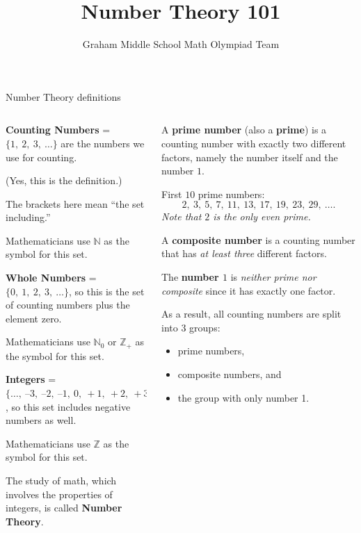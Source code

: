 \documentclass[9pt,aspectratio=169]{beamer}
\title{Number Theory 101}
\subtitle[Graham Middle School]{Graham Middle School Math Olympiad Team}
\begin{document}
\maketitle

\begin{frame}{Number Theory definitions}
  \begin{columns}[T]
    \begin{column}{0.5\textwidth}
      \textbf{Counting Numbers} = $\{1,\ 2,\ 3,\ \ldots\}$ are the numbers we use for counting. 
      
      (Yes, this is the definition.)

      The brackets here mean “the set including.” 
      
      Mathematicians use $\mathbb{N}$ as the symbol for this set.\medskip

      \textbf{Whole Numbers} = $\{0,\ 1,\ 2,\ 3,\ \ldots\}$, so this is the set of counting numbers plus the element zero. 
      
      Mathematicians use $\mathbb{N}_0$ or $\mathbb{Z}_+$ as the symbol for this set.\medskip

      \textbf{Integers} = $\{\ldots,\ –3,\ –2,\ –1,\ 0,\ +1,\ +2,\ +3,\ \ldots\}$, so this set includes negative numbers as well. 
      
      Mathematicians use $\mathbb{Z}$ as the symbol for this set.\medskip

      The study of math, which involves the properties of integers, is called \textbf{Number Theory}.
    \end{column}
    \begin{column}{0.5\textwidth}
      \begin{definition}
        A \textbf{prime number} (also a \textbf{prime}) is a counting number with exactly two different factors, namely the number itself and the number $1$. 
        
        First $10$ prime numbers: 
        \[ 2,\ 3,\ 5,\ 7,\ 11,\ 13,\ 17,\ 19,\ 23,\ 29,\ \ldots. \]
        \emph{Note that $2$ is the only even prime.}
      \end{definition}

      \begin{example}
        A \textbf{composite number} is a counting number that has \emph{at least three} different factors.\smallskip

        The \textbf{number $1$} is \emph{neither prime nor composite} since it has exactly one factor.
      \end{example}
      As a result, all counting numbers are split into $3$ groups:
      \begin{itemize}
        \item prime numbers, 
        \item composite numbers, and 
        \item the group with only number 1.
      \end{itemize}
    \end{column}
  \end{columns}
\end{frame}
\end{document}

